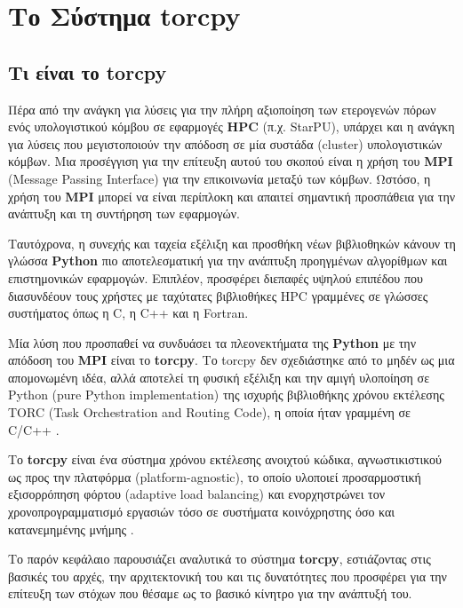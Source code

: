 
\chapter{Το Σύστημα torcpy}   

\section{Τι είναι το torcpy}

Πέρα από την ανάγκη για λύσεις για την πλήρη αξιοποίηση των ετερογενών πόρων ενός υπολογιστικού κόμβου σε εφαρμογές \textbf{HPC} (π.χ. StarPU), υπάρχει και η ανάγκη για λύσεις που μεγιστοποιούν την απόδοση σε μία συστάδα (cluster) υπολογιστικών κόμβων. Μια προσέγγιση για την επίτευξη αυτού του σκοπού είναι η χρήση του \textbf{MPI} (Message Passing Interface) για την επικοινωνία μεταξύ των κόμβων. Ωστόσο, η χρήση του \textbf{MPI} μπορεί να είναι περίπλοκη και απαιτεί σημαντική προσπάθεια για την ανάπτυξη και τη συντήρηση των εφαρμογών.

Ταυτόχρονα, η συνεχής και ταχεία εξέλιξη και προσθήκη νέων βιβλιοθηκών κάνουν τη γλώσσα \textbf{Python} πιο αποτελεσματική για την ανάπτυξη προηγμένων αλγορίθμων και επιστημονικών εφαρμογών. Επιπλέον, προσφέρει διεπαφές υψηλού επιπέδου που διασυνδέουν τους χρήστες με ταχύτατες βιβλιοθήκες HPC γραμμένες σε γλώσσες συστήματος όπως η C, η C++ και η Fortran.

Μία λύση που προσπαθεί να συνδυάσει τα πλεονεκτήματα της \textbf{Python} με την απόδοση του \textbf{MPI} είναι το \textbf{torcpy}. Το torcpy δεν σχεδιάστηκε από το μηδέν ως μια απομονωμένη ιδέα, αλλά αποτελεί τη φυσική εξέλιξη και την αμιγή υλοποίηση σε Python (pure Python implementation) της ισχυρής βιβλιοθήκης χρόνου εκτέλεσης TORC (Task Orchestration and Routing Code), η οποία ήταν γραμμένη σε C/C++ \cite{hadjidoukas2020torcpy}.

Το \textbf{torcpy} είναι ένα σύστημα χρόνου εκτέλεσης ανοιχτού κώδικα, αγνωστικιστικού ως προς την πλατφόρμα (platform-agnostic), το οποίο υλοποιεί προσαρμοστική εξισορρόπηση φόρτου (adaptive load balancing) και ενορχηστρώνει τον χρονοπρογραμματισμό εργασιών τόσο σε συστήματα κοινόχρηστης όσο και κατανεμημένης μνήμης \cite{hadjidoukas2020torcpy}.

Το παρόν κεφάλαιο παρουσιάζει αναλυτικά το σύστημα \textbf{torcpy}, εστιάζοντας στις βασικές του αρχές, την αρχιτεκτονική του και τις δυνατότητες που προσφέρει για την επίτευξη των στόχων που θέσαμε ως το βασικό κίνητρο για την ανάπτυξή του.

